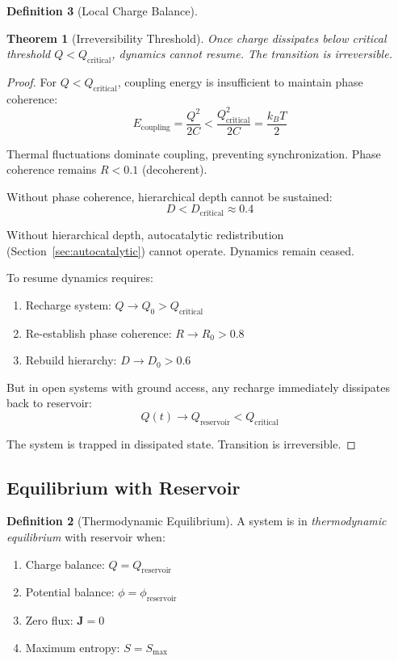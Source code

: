 \documentclass[12pt,a4paper]{article}
\theoremstyle{plain}
\newtheorem{theorem}{Theorem}[section]
\theoremstyle{definition}
\newtheorem{definition}[theorem]{Definition}
\theoremstyle{remark}
\begin{document}
\begin{definition}[Local Charge Balance]
\begin{theorem}[Irreversibility Threshold]
\label{thm:irreversibility}
Once charge dissipates below critical threshold $Q < Q_{\text{critical}}$, dynamics cannot resume. The transition is irreversible.
\end{theorem}

\begin{proof}
For $Q < Q_{\text{critical}}$, coupling energy is insufficient to maintain phase coherence:
\begin{equation}
E_{\text{coupling}} = \frac{Q^2}{2C} < \frac{Q_{\text{critical}}^2}{2C} = \frac{k_B T}{2}
\end{equation}

Thermal fluctuations dominate coupling, preventing synchronization. Phase coherence remains $R < 0.1$ (decoherent).

Without phase coherence, hierarchical depth cannot be sustained:
\begin{equation}
D < D_{\text{critical}} \approx 0.4
\end{equation}

Without hierarchical depth, autocatalytic redistribution (Section~\ref{sec:autocatalytic}) cannot operate. Dynamics remain ceased.

To resume dynamics requires:
\begin{enumerate}
\item Recharge system: $Q \to Q_0 > Q_{\text{critical}}$
\item Re-establish phase coherence: $R \to R_0 > 0.8$
\item Rebuild hierarchy: $D \to D_0 > 0.6$
\end{enumerate}

But in open systems with ground access, any recharge immediately dissipates back to reservoir:
\begin{equation}
Q(t) \to Q_{\text{reservoir}} < Q_{\text{critical}}
\end{equation}

The system is trapped in dissipated state. Transition is irreversible.
\end{proof}

\subsection{Equilibrium with Reservoir}

\begin{definition}[Thermodynamic Equilibrium]
\label{def:thermo_equilibrium}
A system is in \emph{thermodynamic equilibrium} with reservoir when:
\begin{enumerate}
\item Charge balance: $Q = Q_{\text{reservoir}}$
\item Potential balance: $\phi = \phi_{\text{reservoir}}$
\item Zero flux: $\mathbf{J} = 0$
\item Maximum entropy: $S = S_{\max}$
\end{enumerate}
\end{definition}


\end{definition}
\end{document}
